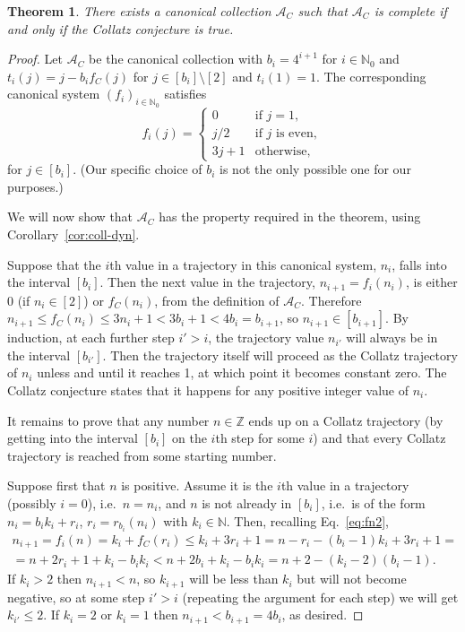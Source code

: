 \documentclass[10pt,a4paper]{amsart}
\newtheorem{theorem}{Theorem}
\newcommand{\N}{\mathbb{N}}
\newcommand{\Z}{\mathbb{Z}}
\begin{document}
\begin{theorem}
\label{th:Collatz}
There exists a canonical collection $\mathcal{A}_C$ such that $\mathcal{A}_C$ is complete if and only if the Collatz conjecture is true.
\end{theorem}

\begin{proof}
Let $\mathcal{A}_C$ be the canonical collection with $b_i=4^{i+1}$ for $i\in\N_0$ and $t_i(j) = j-b_if_C(j)$ for $j\in[b_i]\setminus[2]$ and $t_i(1) = 1$. The corresponding canonical system $(f_i)_{i\in\N_0}$ satisfies
\[
f_i(j) = 
\begin{cases}
0 & \text{if } j = 1, \\
j/2 & \text{if $j$ is even}, \\
3j+1 & \text{otherwise,}
\end{cases}
\]
for $j\in[b_i]$.
(Our specific choice of $b_i$ is not the only possible one for our purposes.)

We will now show that $\mathcal{A}_C$ has the property required in the theorem, using Corollary~\ref{cor:coll-dyn}.

Suppose that the $i$th value in a trajectory in this canonical system, $n_i$, falls into the interval $[b_i]$. Then the next value in the trajectory, $n_{i+1} = f_{i}(n_i)$, is either 0 (if $n_i\in[2]$) or $f_C(n_i)$, from the definition of $\mathcal{A}_C$. Therefore $n_{i+1} \leqslant f_C(n_i) \leqslant 3n_i+1 < 3b_i+1 < 4b_i = b_{i+1}$, so $n_{i+1}\in[b_{i+1}]$. By induction, at each further step $i'>i$, the trajectory value $n_{i'}$ will always be in the interval $[b_{i'}]$. Then the trajectory itself will proceed as the Collatz trajectory of $n_i$ unless and until it reaches 1, at which point it becomes constant zero. The Collatz conjecture states that it happens for any positive integer value of $n_i$.

It remains to prove that any number $n\in\Z$ ends up on a Collatz trajectory (by getting into the interval $[b_i]$ on the $i$th step for some $i$) and that every Collatz trajectory is reached from some starting number.

Suppose first that $n$ is positive. Assume it is the $i$th value in a trajectory (possibly $i=0$), i.e.\ $n=n_i$, and $n$ is not already in $[b_i]$, i.e.\ is of the form $n_i=b_i k_i + r_i$, $r_i= r_{b_i}(n_i)$ with $k_i\in\N$. Then, recalling Eq.~\eqref{eq:fn2},
\begin{multline*}
n_{i+1} = f_i(n) = k_i + f_C(r_i) \leqslant k_i + 3r_i+1 = n-r_i - (b_i-1)k_i + 3r_i+1 = \\ = n + 2r_i + 1 + k_i - b_i k_i < n  + 2b_i + k_i - b_i k_i = n + 2 - (k_i-2)(b_i-1).
\end{multline*}
If $k_i>2$ then $n_{i+1}<n$, so $k_{i+1}$ will be less than $k_i$ but will not become negative, so at some step $i'>i$ (repeating the argument for each step) we will get $k_{i'}\leqslant2$. If $k_i=2$ or $k_i=1$ then $n_{i+1}<b_{i+1}=4b_i$, as desired.


\end{proof}
\end{document}
